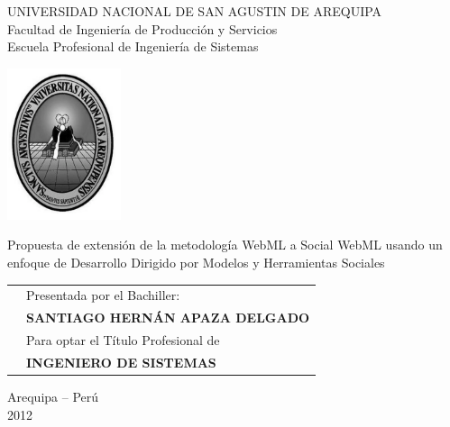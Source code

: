 \documentclass[a4paper]{report}
\begin{document}
\begin{titlepage}  
  \begin{center}
    \Large
    UNIVERSIDAD NACIONAL DE SAN AGUSTIN DE AREQUIPA\\
    Facultad de Ingenier\'ia de Producci\'on y Servicios\\
    Escuela Profesional de Ingenier\'ia de Sistemas
    \vspace{0.5cm} 
    \begin{center}
      \includegraphics[width=0.25\textwidth]{figure/unsa.png}
    \end{center}
    \begin{center}
      \LARGE
      	Propuesta de extensi\'on de la metodolog\'ia WebML a Social WebML
      	usando un enfoque de Desarrollo Dirigido por Modelos y Herramientas
      	Sociales
    \end{center} 
    \vfill
    
	\begin{table}[htbp]
	\centering
		\begin{tabular}{p{}p{}}
				&	Presentada por el Bachiller: \\ 
				&	\textbf{SANTIAGO HERN\'AN APAZA DELGADO}\\
				&	Para optar el T\'itulo Profesional de \\ 
				&	\textbf{INGENIERO DE SISTEMAS}\\	
		\end{tabular}
	\end{table}
	
    \vfill
    Arequipa -- Per\'u\\
	2012
  \end{center}
\end{titlepage}
\end{document}
